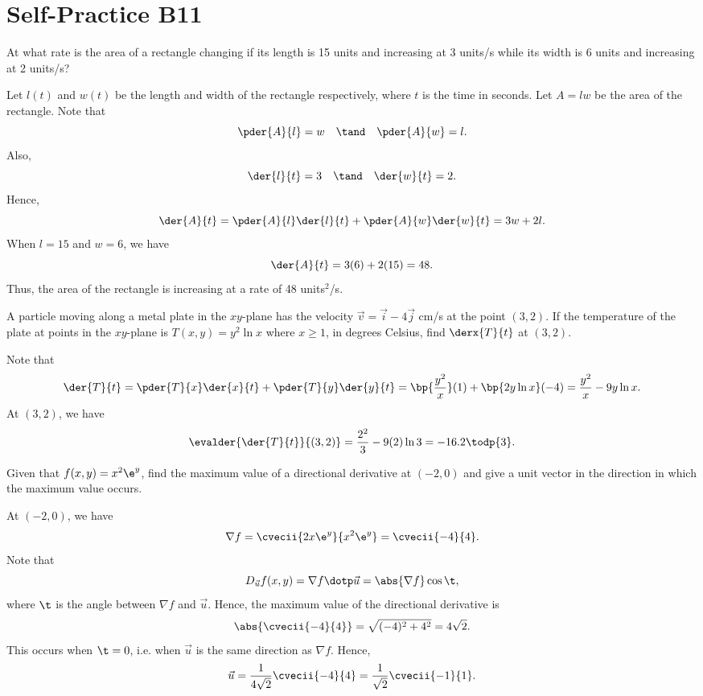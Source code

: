 \section{Self-Practice B11}

\begin{problem}
    At what rate is the area of a rectangle changing if its length is 15 units and increasing at 3 units/s while its width is 6 units and increasing at 2 units/s?
\end{problem}
\begin{solution}
    Let $l(t)$ and $w(t)$ be the length and width of the rectangle respectively, where $t$ is the time in seconds. Let $A = lw$ be the area of the rectangle. Note that \[\pder{A}{l} = w \quad \tand \quad \pder{A}{w} = l.\] Also, \[\der{l}{t} = 3 \quad \tand \quad \der{w}{t} = 2.\] Hence, \[\der{A}{t} = \pder{A}{l} \der{l}{t} + \pder{A}{w} \der{w}{t} = 3w + 2l.\] When $l = 15$ and $w = 6$, we have \[\der{A}{t} = 3(6) + 2(15) = 48.\] Thus, the area of the rectangle is increasing at a rate of 48 units$^2$/s.
\end{solution}

\begin{problem}
    A particle moving along a metal plate in the $xy$-plane has the velocity $\vec v = \vec i - 4 \vec j$ cm/s at the point $(3, 2)$. If the temperature of the plate at points in the $xy$-plane is $T(x, y) = y^2 \ln x$ where $x \geq 1$, in degrees Celsius, find $\derx{T}{t}$ at $(3, 2)$.
\end{problem}
\begin{solution}
    Note that \[\der{T}{t} = \pder{T}{x} \der{x}{t} + \pder{T}{y} \der{y}{t} = \bp{\frac{y^2}{x}} (1) + \bp{2y \ln x} (-4) = \frac{y^2}{x} - 9y \ln x.\] At $(3, 2)$, we have \[\evalder{\der{T}{t}}{(3, 2)} = \frac{2^2}{3} - 9(2) \ln 3 = -16.2 \todp{3}.\]
\end{solution}

\begin{problem}
    Given that $f(x, y) = x^2 \e^y$, find the maximum value of a directional derivative at $(-2, 0)$ and give a unit vector in the direction in which the maximum value occurs.
\end{problem}
\begin{solution}
    At $(-2, 0)$, we have \[\nabla f = \cvecii{2x \e^y}{x^2 \e^y} = \cvecii{-4}{4}.\] Note that \[D_{\vec u} f(x, y) = \nabla f \dotp \vec u = \abs{\nabla f} \cos \t,\] where $\t$ is the angle between $\nabla f$ and $\vec u$. Hence, the maximum value of the directional derivative is \[\abs{\cvecii{-4}{4}} = \sqrt{(-4)^2 + 4^2} = 4\sqrt{2}.\] This occurs when $\t = 0$, i.e. when $\vec u$ is the same direction as $\nabla f$. Hence, \[\vec u = \frac1{4\sqrt{2}} \cvecii{-4}{4} = \frac1{\sqrt2} \cvecii{-1}{1}.\]
\end{solution}

